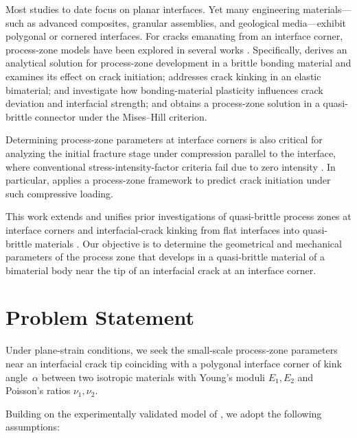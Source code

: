 Most studies to date focus on planar interfaces. Yet many engineering materials—such as advanced composites, granular assemblies, and geological media—exhibit polygonal or cornered interfaces. For cracks emanating from an interface corner, process-zone models have been explored in several works \cite{Bogdanova12,Bogdanova13,Bogdanova14,Bogdanova15,Bogdanova23}. Specifically, \cite{Bogdanova15} derives an analytical solution for process-zone development in a brittle bonding material and examines its effect on crack initiation; \cite{Bogdanova12} addresses crack kinking in an elastic bimaterial; \cite{Bogdanova14} and \cite{Bogdanova13} investigate how bonding-material plasticity influences crack deviation and interfacial strength; and \cite{Bogdanova23} obtains a process-zone solution in a quasi-brittle connector under the Mises–Hill criterion.

Determining process-zone parameters at interface corners is also critical for analyzing the initial fracture stage under compression parallel to the interface, where conventional stress-intensity‐factor criteria fail due to zero intensity \cite{Bogdanova3,Bogdanova4,Bogdanova5,Bogdanova6,Bogdanova20}. In particular, \cite{Bogdanova22} applies a process-zone framework to predict crack initiation under such compressive loading.

This work extends and unifies prior investigations of quasi-brittle process zones at interface corners \cite{Bogdanova23} and interfacial‐crack kinking from flat interfaces into quasi-brittle materials \cite{Bogdanova15}. Our objective is to determine the geometrical and mechanical parameters of the process zone that develops in a quasi-brittle material of a bimaterial body near the tip of an interfacial crack at an interface corner.

\section{Problem Statement}
\label{BogdanovaSec2}

Under plane‐strain conditions, we seek the small‐scale process‐zone parameters near an interfacial crack tip coinciding with a polygonal interface corner of kink angle~$\alpha$ between two isotropic materials with Young’s moduli $E_{1},E_{2}$ and Poisson’s ratios $\nu_{1},\nu_{2}$.

Building on the experimentally validated model of \cite{Bogdanova27}, we adopt the following assumptions:

